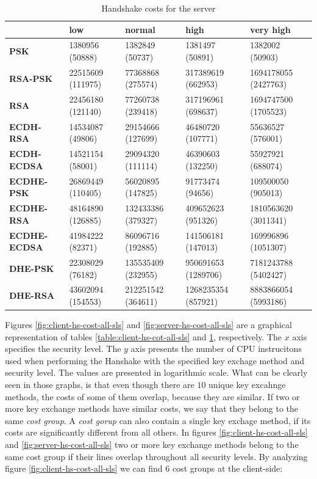 \documentclass{llncs}
\begin{document}
  \begin{table}[]
\begin{tabular}{|l|l|l|l|l|}
\hline
                     & \textbf{low}      & \textbf{normal}    & \textbf{high}       & \textbf{very high}   \\ \hline
\textbf{PSK}         & 1380956 (50888)   & 1382849 (50737)    & 1381497 (50891)     & 1382002 (50903)      \\ \hline
\textbf{RSA-PSK}     & 22515609 (111975) & 77368868 (275574)  & 317389619 (662953)  & 1694178055 (2427763) \\ \hline
\textbf{RSA}         & 22456180 (121140) & 77260738 (239418)  & 317196961 (698637)  & 1694747500 (1705523) \\ \hline
\textbf{ECDH-RSA}    & 14534087 (49806)  & 29154666 (127699)  & 46480720 (107771)   & 55636527 (576001)    \\ \hline
\textbf{ECDH-ECDSA}  & 14521154 (58001)  & 29094320 (111114)  & 46390603 (132250)   & 55927921 (688074)    \\ \hline
\textbf{ECDHE-PSK}   & 26869449 (110405) & 56020895 (147825)  & 91773474 (94656)    & 109500050 (905013)   \\ \hline
\textbf{ECDHE-RSA}   & 48164890 (126885) & 132433386 (379327) & 409652623 (951326)  & 1810563620 (3011341) \\ \hline
\textbf{ECDHE-ECDSA} & 41984222 (82371)  & 86096716 (192885)  & 141506181 (147013)  & 169996896 (1051307)  \\ \hline
\textbf{DHE-PSK}     & 22308029 (76182)  & 135535409 (232955) & 950691653 (1289706) & 7181243788 (5402427) \\ \hline
\textbf{DHE-RSA}     & 43602094 (154553) & 212251542 (364611) & 1268235354 (857921) & 8883866054 (5993186) \\ \hline
\end{tabular}
  \centering \centering \caption{\label{table:server-hs-cost-all-sls} Handshake costs for the server}
\end{table}

Figures \ref{fig:client-hs-cost-all-sls} and \ref{fig:server-hs-cost-all-sls} are a graphical representation of tables \ref{table:client-hs-cot-all-sls}
and \ref{table:server-hs-cost-all-sls}, respectively. The $x$ axis specifies the security level. The $y$ axis presents the number 
of CPU instrucitons used when performing the Hanshake with the specified key exchage method and security level. 
The values are presented in logarithmic scale.  What can be clearly seen in those 
graphs, is that even though there are $10$ unique key excahnge methods, the costs of some of them overlap, because they are similar.
If two or more key exchange methods have similar costs, we say that they belong to the same \textit{cost group}. A \textit{cost gorup}
can also contain a single key exchage method, if its costs are significantly different from all others. In figures
\ref{fig:client-hs-cost-all-sls} and \ref{fig:server-hs-cost-all-sls} two or more key exchange methods belong to the same
cost group if their lines overlap throughout all security levels. By analyzing figure \ref{fig:client-hs-cost-all-sls} we can
find $6$ cost groups at the client-side:
\end{document}
